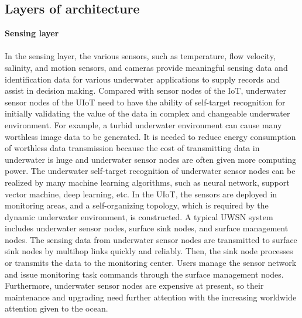 \documentclass[a4paper,12pt]{article}
\begin{document}
\begin{multicols}{2}
\section{Layers of architecture}

\item\textbf{Sensing layer}\\
\\
In the sensing layer, the various sensors, such as temperature, flow velocity, salinity, and motion sensors, and cameras provide meaningful sensing data and identification data for various underwater applications to supply records and assist in decision making. Compared with sensor nodes of the IoT, underwater sensor nodes of the UIoT need to have the ability of self-target recognition for initially validating the value of the data in complex and changeable underwater environment. For example, a turbid underwater environment can cause many worthless image data to be generated. It is needed to reduce energy consumption of worthless data transmission because the cost of transmitting data in underwater is huge and underwater sensor nodes are often given more computing power. The underwater self-target recognition of underwater sensor nodes can be realized by many machine learning algorithms, such as neural network, support vector machine, deep learning, etc. In the UIoT, the sensors are deployed in monitoring areas, and a self-organizing topology, which is required by the dynamic underwater environment, is constructed. A typical UWSN system includes underwater sensor nodes, surface sink nodes, and surface management nodes. The sensing data from underwater sensor nodes are transmitted to surface sink nodes by multihop links quickly and reliably. Then, the sink node processes or transmits the data to the monitoring center. Users manage the sensor network and issue monitoring task commands through the surface management nodes. Furthermore, underwater sensor nodes are expensive at present, so their maintenance and upgrading need further attention with the increasing worldwide attention given to the ocean.


\end{multicols}
\end{document}
